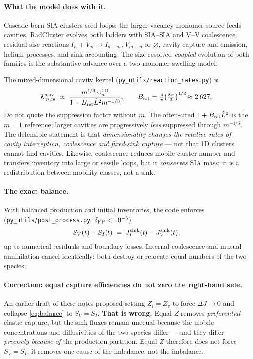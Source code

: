\documentclass[11pt,a4paper]{article}
\newcommand{\code}[1]{\texttt{\small #1}}
\newcommand{\flag}[1]{\textcolor{red!70!black}{#1}}
\begin{document}
\paragraph{What the model does with it.}
Cascade-born SIA clusters seed loops; the larger vacancy-monomer source feeds
cavities. RadCluster evolves both ladders with SIA--SIA and V--V coalescence,
residual-size reactions $I_n+V_m\rightarrow I_{n-m},\,V_{m-n}$ or $\varnothing$,
cavity capture and emission, helium processes, and sink accounting. The
size-resolved \emph{coupled} evolution of both families is the substantive
advance over a two-monomer swelling model.

The mixed-dimensional cavity kernel (\code{py\_utils/reaction\_rates.py}) is
\[
\mathcal{K}^{\rm cav}_{n,m}\;\propto\;
\frac{m^{1/3}\,\omega^{\rm 1D}_n}{1+B_{\rm rot}\hat L^2 m^{-1/3}},
\qquad B_{\rm rot}=\tfrac{4}{\pi}\bigl(\tfrac{8\pi}{3}\bigr)^{1/3}\!\approx2.627 .
\]
\flag{Do not quote the suppression factor without $m$.} The often-cited
$1+B_{\rm rot}\hat L^2$ is the $m\!=\!1$ reference; larger cavities are
progressively \emph{less} suppressed through $m^{-1/3}$. The defensible statement
is that \emph{dimensionality changes the relative rates of cavity interception,
coalescence and fixed-sink capture} --- not that 1D clusters cannot find
cavities. Likewise, coalescence reduces mobile cluster number and transfers
inventory into large or sessile loops, but it \emph{conserves} SIA mass; it is a
redistribution between mobility classes, not a sink.

\paragraph{The exact balance.}
With balanced production and initial inventories, the code enforces
(\code{py\_utils/post\_process.py}, $\delta_{\rm FP}<10^{-6}$)
\begin{equation}
S_V(t)-S_I(t)\;=\;J^{\rm sink}_I(t)-J^{\rm sink}_V(t),
\label{eq:balance}
\end{equation}
up to numerical residuals and boundary losses. Internal coalescence and mutual
annihilation cancel identically: both destroy or relocate equal numbers of the
two species.

\paragraph{\flag{Correction: equal capture efficiencies do not zero the right-hand side.}}
An earlier draft of these notes proposed setting $Z_i=Z_v$ to force
$\Delta J\!\to\!0$ and collapse \eqref{eq:balance} to $S_V=S_I$. \textbf{That is
wrong.} Equal $Z$ removes \emph{preferential} elastic capture, but the sink
fluxes remain unequal because the mobile concentrations and diffusivities of the
two species differ --- and they differ \emph{precisely because of} the production
partition. Equal $Z$ therefore does not force $S_V=S_I$; it removes one cause of
the imbalance, not the imbalance.
\end{document}
